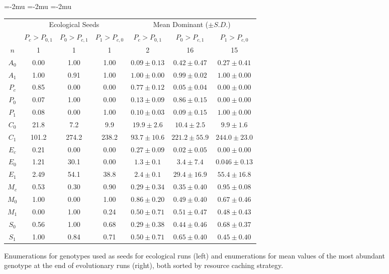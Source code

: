 \begin{figure}[!htbp]

\begin{center}
\setlength\tabcolsep{1.5pt} %
\medmuskip=-2mu
\thinmuskip=-2mu
\thickmuskip=-2mu
\nulldelimiterspace=-1pt
\scriptspace=0pt
\begin{tabular}{ | c || c c c | c c c | }
  \multicolumn{1}{c}{} & \multicolumn{3}{c}{Ecological Seeds} & \multicolumn{3}{c}{Mean Dominant ($\pm S.D.$)} \\
 \cline{2-7}
  \multicolumn{1}{c|}{} & \tiny{$P_{c} > P_{0,1}$} & \tiny{$P_0 > P_{c,1}$} & \tiny{$P_1 > P_{c,0}$} & \tiny{$P_{c} > P_{0,1}$} & \tiny{$P_0 > P_{c,1}$} & \tiny{$P_1 > P_{c,0}$}  \\
 \hline
 $n$ & 1 & 1 & 1 & 2 & 16 & 15  \\
 \hhline{|=||===|===|}
 $A_0$ & 0.00 & 1.00 & 1.00 & $0.09 \pm 0.13$ & $0.42 \pm 0.47$ & $0.27 \pm 0.41$ \\
 $A_1$ & 1.00 & 0.91 & 1.00 & $1.00 \pm  0.00$ & $0.99 \pm 0.02$ & $1.00 \pm 0.00$ \\
 \hline
 $P_{c}$ & 0.85 & 0.00 & 0.00 & $0.77 \pm 0.12$ & $0.05 \pm 0.04$ & $0.00 \pm 0.00$ \\
 $P_0$ & 0.07 & 1.00 & 0.00 & $0.13 \pm 0.09$ & $0.86 \pm 0.15$ & $0.00 \pm 0.00$ \\
 $P_1$ & 0.08 & 0.00 & 1.00 & $0.10 \pm 0.03$ & $0.09 \pm 0.15$ & $1.00 \pm 0.00$ \\
 \hline
 $C_0$ & 21.8 & 7.2 & 9.9 & $19.9 \pm 2.6$ & $10.4 \pm 2.5$ & $9.9 \pm 1.6$ \\
 $C_1$ & 101.2 & 274.2 & 238.2 & $93.7 \pm 10.6$ & $221.2 \pm 55.9$ & $244.0 \pm 23.0 $ \\
 \hline
 $E_{c}$ & 0.21 & 0.00 & 0.00 & $0.27 \pm 0.09$ & $0.02 \pm 0.05$ & $0.00 \pm 0.00$ \\
 $E_0$ & 1.21 & 30.1 & 0.00 & $1.3 \pm 0.1$ & $3.4 \pm 7.4$ & $0.046 \pm 0.13$ \\
 $E_1$ & 2.49 & 54.1 & 38.8 & $2.4 \pm 0.1$ & $29.4 \pm 16.9$ & $55.4 \pm 16.8$ \\
 \hline
 $M_{c}$ & 0.53 & 0.30 & 0.90 & $0.29 \pm 0.34$ & $0.35 \pm 0.40$ & $0.95 \pm 0.08$ \\
 $M_0$ & 1.00 & 0.00 & 1.00 & $0.86 \pm 0.20$ & $0.49 \pm 0.40$ & $0.67 \pm 0.46$ \\
 $M_1$ & 0.00 & 1.00 & 0.24 & $0.50 \pm 0.71$ & $0.51 \pm 0.47$ & $0.48 \pm 0.43$ \\
 \hline
 $S_0$ & 0.56 & 1.00 & 0.68 & $0.29 \pm 0.38$ & $0.44 \pm 0.46$ & $0.68 \pm 0.37$ \\
 $S_1$ & 1.00 & 0.84 & 0.71 & $0.50 \pm 0.71$ & $0.65 \pm 0.40$ & $0.45 \pm 0.40$ \\
 \hline
\end{tabular}
\end{center}
\caption{
Enumerations for genotypes used as seeds for ecological runs (left) and enumerations for mean values of the most abundant genotype at the end of evolutionary runs (right), both sorted by resource caching strategy.
}
\label{fig:genotypes}
\end{figure}
